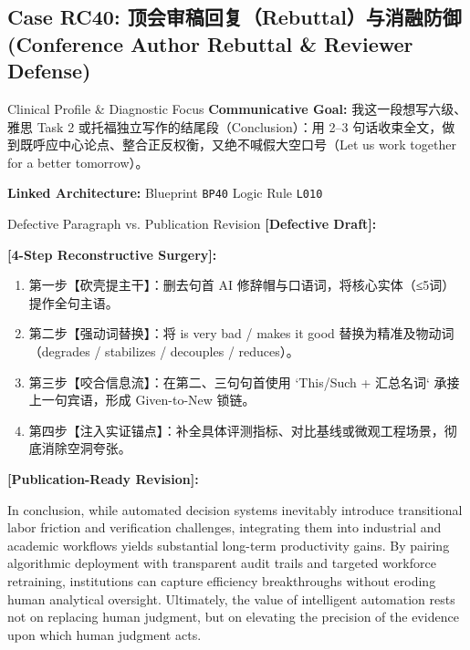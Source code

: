 \subsection{Case RC40: 顶会审稿回复（Rebuttal）与消融防御 (Conference Author Rebuttal \& Reviewer Defense)}\label{case:RC40}
\begin{ConceptBox}{Clinical Profile \& Diagnostic Focus}
\textbf{Communicative Goal:} 我这一段想写六级、雅思 Task 2 或托福独立写作的结尾段（Conclusion）：用 2--3 句话收束全文，做到既呼应中心论点、整合正反权衡，又绝不喊假大空口号（Let us work together for a better tomorrow）。\par
\textbf{Linked Architecture:} Blueprint \texttt{BP40} \enspace\textbar\enspace Logic Rule \texttt{L010}
\end{ConceptBox}
\begin{ExampleBox}{Defective Paragraph vs. Publication Revision}
\textbf{\color{TargetHighlight}[Defective Draft]:}\par
{}\par\vspace{6pt}
\textbf{\color{AcadForest}[4-Step Reconstructive Surgery]:}
\begin{enumerate}[label=\textbf{\color{AcadNavy}Step \arabic*:}, leftmargin=2em]
  \item 第一步【砍壳提主干】：删去句首 AI 修辞帽与口语词，将核心实体（≤5词）提作全句主语。
  \item 第二步【强动词替换】：将 is very bad / makes it good 替换为精准及物动词（degrades / stabilizes / decouples / reduces）。
  \item 第三步【咬合信息流】：在第二、三句句首使用 `This/Such + 汇总名词` 承接上一句宾语，形成 Given-to-New 锁链。
  \item 第四步【注入实证锚点】：补全具体评测指标、对比基线或微观工程场景，彻底消除空洞夸张。
\end{enumerate}\vspace{4pt}
\textbf{\color{AcadNavy}[Publication-Ready Revision]:}\par
In conclusion, while automated decision systems inevitably introduce transitional labor friction and verification challenges, integrating them into industrial and academic workflows yields substantial long-term productivity gains. By pairing algorithmic deployment with transparent audit trails and targeted workforce retraining, institutions can capture efficiency breakthroughs without eroding human analytical oversight. Ultimately, the value of intelligent automation rests not on replacing human judgment, but on elevating the precision of the evidence upon which human judgment acts.
\end{ExampleBox}
